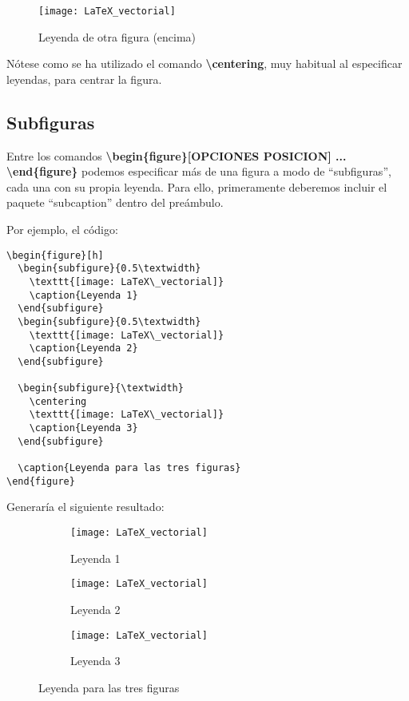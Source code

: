 \begin{figure}[h]
  \caption{Leyenda de otra figura (encima)}	
  \centering
  \texttt{[image: LaTeX\_vectorial]}
\end{figure}

Nótese como se ha utilizado el comando \textbf{\textbackslash centering}, muy habitual al especificar leyendas, para centrar la figura.

\subsection{Subfiguras}

Entre los comandos \textbf{\textbackslash begin\{figure\}[OPCIONES POSICION] ... \textbackslash end\{figure\}} podemos especificar más de una figura a modo de ``subfiguras'', cada una con su propia leyenda. Para ello, primeramente deberemos incluir el paquete ``subcaption'' dentro del preámbulo.

Por ejemplo, el código:

\begin{lstlisting}[language={[LaTeX]Tex}]
\begin{figure}[h]
  \begin{subfigure}{0.5\textwidth}
    \texttt{[image: LaTeX\_vectorial]}
    \caption{Leyenda 1}
  \end{subfigure}
  \begin{subfigure}{0.5\textwidth}
    \texttt{[image: LaTeX\_vectorial]}
    \caption{Leyenda 2}
  \end{subfigure}
	
  \begin{subfigure}{\textwidth}
    \centering
    \texttt{[image: LaTeX\_vectorial]}
    \caption{Leyenda 3}
  \end{subfigure}

  \caption{Leyenda para las tres figuras}
\end{figure}
\end{lstlisting}

Generaría el siguiente resultado:

\begin{figure}[h]
	\begin{subfigure}{0.5\textwidth}
		\texttt{[image: LaTeX\_vectorial]} 
		\caption{Leyenda 1}
	\end{subfigure}
	\begin{subfigure}{0.5\textwidth}
		\texttt{[image: LaTeX\_vectorial]}
		\caption{Leyenda 2}
	\end{subfigure}
	
	\begin{subfigure}{\textwidth}
		\centering
		\texttt{[image: LaTeX\_vectorial]}
		\caption{Leyenda 3}
	\end{subfigure}

	\caption{Leyenda para las tres figuras}
\end{figure}

